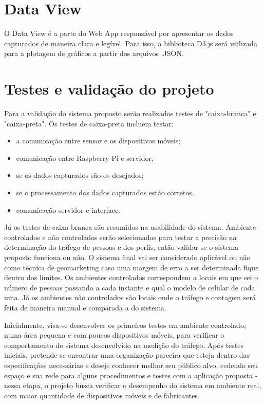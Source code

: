 \section{Data View}
O Data View é a parte do Web App responsável por apresentar os dados capturados de maneira clara e legível. Para isso, a biblioteca D3.js \cite{D32017} será utilizada para a plotagem de gráficos a partir dos arquivos .JSON.


\section{Testes e validação do projeto}
Para a validação do sistema proposto serão realizados testes de "caixa-branca" e "caixa-preta". Os testes de caixa-preta incluem testar:
\begin{itemize}
  \item a comunicação entre sensor e os dispositivos móveis;
  \item comunicação entre Raspberry Pi e servidor;
  \item se os dados capturados são os desejados;
  \item se o processamento dos dados capturados estão corretos.
  \item comunicação servidor e interface.
\end{itemize}

Já os testes de caixa-branca são resumidos na usabilidade do sistema. Ambiente controlados e não controlados serão selecionados
para testar a precisão na determinação do tráfego de pessoas e dos perfis, então validar se o sistema proposto funciona ou não.
O sistema final vai ser considerado aplicável ou não como técnica de geomarketing caso uma margem de erro a ser determinada fique dentro
dos limites. Os ambientes controlados correspondem a locais em que sei o número de pessoas passando a cada instante e qual o modelo de celular
de cada uma. Já os ambientes não controlados são locais onde o tráfego e contagem será feita de maneira manual e comparada a do sistema.

Inicialmente, visa-se desenvolver os primeiros testes em ambiente
controlado, numa área pequena e com poucos dispositivos móveis, para verificar o
comportamento do sistema desenvolvido na medição do tráfego. Após testes
iniciais, pretende-se encontrar uma organização parceira que esteja dentro das
especificações necessárias e deseje conhecer melhor seu público alvo, cedendo
seu espaço e sua rede para alguns procedimentos e testes com a aplicação proposta
 - nessa etapa, o projeto busca verificar o desempenho do
sistema em ambiente real, com maior quantidade de dispositivos móveis e de
fabricantes.

